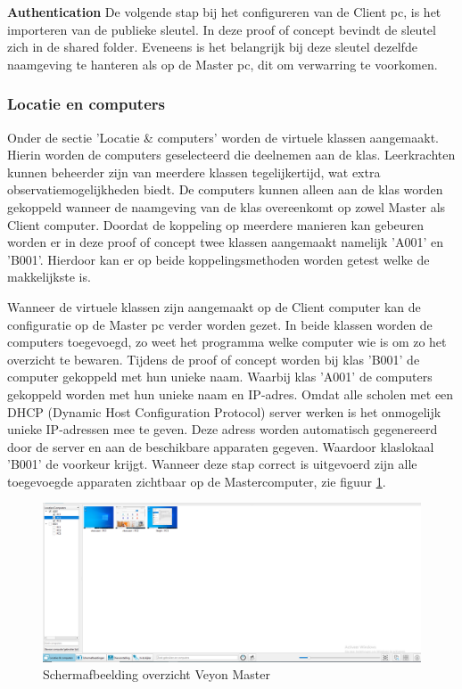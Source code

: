 \textbf{Authentication}\newline
De volgende stap bij het configureren van de Client pc, is het importeren van de publieke sleutel. In deze proof of concept bevindt de sleutel zich in de shared folder. Eveneens is het belangrijk bij deze sleutel dezelfde naamgeving te hanteren als op de Master pc, dit om verwarring te voorkomen. \newline

\subsubsection{Locatie en computers}
Onder de sectie 'Locatie & computers' worden de virtuele klassen aangemaakt. Hierin worden de computers geselecteerd die deelnemen aan de klas. Leerkrachten kunnen beheerder zijn van meerdere klassen tegelijkertijd, wat extra observatiemogelijkheden biedt. De computers kunnen alleen aan de klas worden gekoppeld wanneer de naamgeving van de klas overeenkomt op zowel Master als Client computer. Doordat de koppeling op meerdere manieren kan gebeuren worden er in deze proof of concept twee klassen aangemaakt namelijk 'A001' en 'B001'. Hierdoor kan er op beide koppelingsmethoden worden getest welke de makkelijkste is. \newline

Wanneer de virtuele klassen zijn aangemaakt op de Client computer kan de configuratie op de Master pc verder worden gezet. In beide klassen worden de computers toegevoegd, zo weet het programma welke computer wie is om zo het overzicht te bewaren. Tijdens de proof of concept worden bij klas 'B001' de computer gekoppeld met hun unieke naam. Waarbij klas 'A001' de computers gekoppeld worden met hun unieke naam en IP-adres. Omdat alle scholen met een DHCP (Dynamic Host Configuration Protocol) server werken is het onmogelijk unieke IP-adressen mee te geven. Deze adress worden automatisch gegenereerd door de server en aan de beschikbare apparaten gegeven. Waardoor klaslokaal 'B001' de voorkeur krijgt. Wanneer deze stap correct is uitgevoerd zijn alle toegevoegde apparaten zichtbaar op de Mastercomputer, zie figuur \ref{fig:Schermafbeelding overzicht Veyon Master}.  

\begin{figure}[h]
    \centering
    \includegraphics[width=1\textwidth]{graphics/SchermafbeeldingVeyonMasterOverzicht.png}
    \caption{Schermafbeelding overzicht Veyon Master}
    \label{fig:Schermafbeelding overzicht Veyon Master} 
\end{figure}

